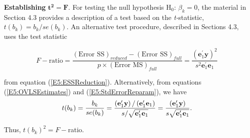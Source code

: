 \textbf{Establishing }$\mathbf{t}^{\mathbf{2}}\mathbf{=F}$. For
testing the null hypothesis H$_0$: $\beta_{k}=0$, the material in
Section 4.3
provides a description of a test based on the \textit{t-}statistic, $%
t(b_{k})=b_{k}/se(b_{k})$. An alternative test procedure, described
in Sections 4.3, uses the test statistic
\begin{center}
\[
F-\text{ratio}=\frac{(\text{Error SS})_{reduced}-(\text{Error SS}%
)_{full}}{p \times (\text{Error MS})_{full}}=\frac{\left( \mathbf{e}%
_1^{\prime}\mathbf{y}\right) ^2}{s^2\mathbf{e}_1^{\prime}%
\mathbf{e}_1}
\]%
\end{center}
from equation (\ref{E5:ESSReduction}). Alternatively, from equations
(\ref{E5:OVLSEstimates}) and (\ref{E5:StdErrorReparam}), we have
\begin{equation}\label{E5:tStat}
t(b_{k})=\frac{b_{k}}{se(b_{k})}=\frac{\left( \mathbf{e}_1^{\prime}%
\mathbf{y}\right) /\left( \mathbf{e}_1^{\prime}\mathbf{e}%
_1\right) }{s/\sqrt{\mathbf{e}_1^{\prime}\mathbf{e}_1}}=%
\frac{\left( \mathbf{e}_1^{\prime}\mathbf{y}\right) }{s\sqrt{%
\mathbf{e}_1^{\prime}\mathbf{e}_1}}.
\end{equation}

\noindent Thus, $t(b_{k})^2=F-$ratio.

